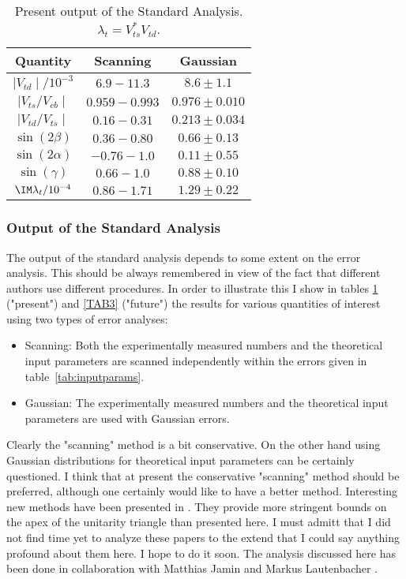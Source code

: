 \begin{table}[thb]
\caption[]{Present output of the Standard Analysis. 
 $\lambda_t=V^*_{ts} V_{td}$.\label{TAB2}}
\vspace{0.4cm}
\begin{center}
\begin{tabular}{|c||c||c|}\hline
{\bf Quantity} & {\bf Scanning} & {\bf Gaussian} \\ \hline
$\mid V_{td}\mid/10^{-3}$ &$6.9 - 11.3$ &$ 8.6\pm 1.1$ \\ \hline
$\mid V_{ts}/V_{cb}\mid$ &$0.959 - 0.993$ &$0.976\pm 0.010$  \\ \hline
$\mid V_{td}/V_{ts}\mid$ &$0.16 - 0.31$ &$0.213\pm 0.034$  \\ \hline
$\sin(2\beta)$ &$0.36 - 0.80$ &$ 0.66\pm0.13 $ \\ \hline
$\sin(2\alpha)$ &$-0.76 - 1.0$ &$ 0.11\pm 0.55 $ \\ \hline
$\sin(\gamma)$ &$0.66 - 1.0 $ &$ 0.88\pm0.10 $ \\ \hline
$\IM \lambda_t/10^{-4}$ &$0.86 - 1.71 $ &$ 1.29\pm 0.22 $ \\ \hline
\end{tabular}
\end{center}
\end{table}

\subsubsection{Output of the Standard Analysis}
The output of the standard analysis depends to some extent on the
error analysis. This should be always remembered in view of the fact
that different authors use different procedures. In order to illustrate
this  I show in tables \ref{TAB2} ("present") and \ref{TAB3} ("future") 
the results for various quantities of interest
using two types of error analyses:

\begin{itemize}
\item
Scanning: Both the experimentally measured numbers and the theoretical input
parameters are scanned independently within the errors given in
table~\ref{tab:inputparams}. 
\item
Gaussian: The experimentally measured numbers and the theoretical input 
parameters are used with Gaussian errors.
\end{itemize}
Clearly the "scanning" method is a bit conservative. On the other
hand using Gaussian distributions for theoretical input parameters
can be certainly questioned. 
I think that
at present the conservative "scanning" method should be preferred,
although one certainly would like to have a better method. Interesting
new methods have been presented in \cite{FRENCH,PAGA}.
They provide more stringent bounds on the apex of the unitarity triangle
than presented here. I must admitt that I did not find time yet
to analyze these papers to the extend that I could say anything profound
about them here. I hope to do it soon.
The analysis discussed here has been done in collaboration with Matthias 
Jamin and Markus Lautenbacher \cite{BJL96b}.


